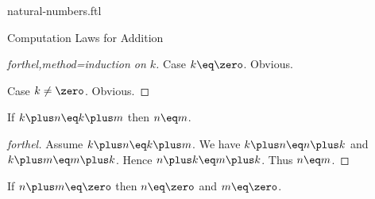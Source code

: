 \documentclass{naproche-library}
\begin{document}
\begin{smodule}[title=Natural Numbers]{natural-numbers.ftl}
\begin{sfragment}{Computation Laws for Addition}
\begin{proof}[forthel,method=induction on $k$]
    Case $k\eq\zero$. Obvious.

    Case $k\neq\zero$. Obvious.
  \end{proof}

  \begin{corollary}[forthel,title=Left cancellation,id=PlusIsLeftCancellativeProp]
    If $k\plus n\eq k\plus m$ then $n\eq m$.
  \end{corollary}
  \begin{proof}[forthel]
    Assume $k\plus n\eq k\plus m$.
    We have $k\plus n\eq n\plus k$ and $k\plus m\eq m\plus k$.
    Hence $n\plus k\eq m\plus k$.
    Thus $n\eq m$.
  \end{proof}

  \begin{proposition}[forthel,id=ZeroSumImpliesZeroSummandsProp]
    If $n\plus m\eq\zero$ then $n\eq\zero$ and $m\eq\zero$.
  \end{proposition}
\end{sfragment}
\end{smodule}
\end{document}
